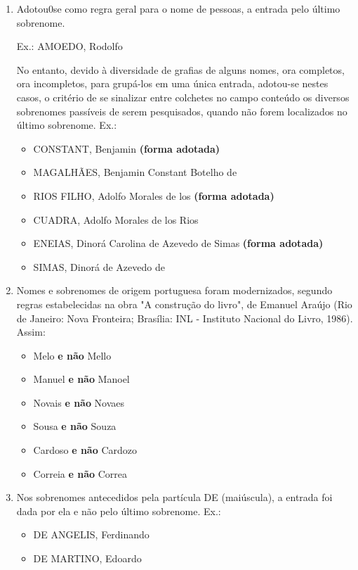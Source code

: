 \begin{enumerate}[label=(\alph*)]
	\item Adotou0se como regra geral para o nome de pessoas, a entrada pelo último sobrenome.
	
	Ex.: AMOEDO, Rodolfo
	
	No entanto, devido à diversidade de grafias de alguns nomes, ora completos, ora incompletos, para grupá-los em uma única entrada, adotou-se nestes casos, o critério de se sinalizar entre colchetes no campo conteúdo os diversos sobrenomes passíveis de serem pesquisados, quando não forem localizados no último sobrenome. Ex.:
	\begin{itemize}
		\item CONSTANT, Benjamin \textbf{(forma adotada)}
		\item MAGALHÃES, Benjamin Constant Botelho de
		\item RIOS FILHO, Adolfo Morales de los \textbf{(forma adotada)}
		\item CUADRA, Adolfo Morales de los Rios
		\item ENEIAS, Dinorá Carolina de Azevedo de Simas \textbf{(forma adotada)}
		\item SIMAS, Dinorá de Azevedo de
	\end{itemize}
	
	\item Nomes e sobrenomes de origem portuguesa foram modernizados, segundo regras estabelecidas na obra "A construção do livro", de Emanuel Araújo (Rio de Janeiro: Nova Fronteira; Brasília: INL - Instituto Nacional do Livro, 1986). Assim:
	\begin{itemize}
		\item Melo \textbf{e não} Mello
		\item Manuel \textbf{e não} Manoel
		\item Novais \textbf{e não} Novaes
		\item Sousa \textbf{e não} Souza
		\item Cardoso \textbf{e não} Cardozo
		\item Correia \textbf{e não} Correa
	\end{itemize}
	
	\item Nos sobrenomes antecedidos pela partícula DE (maiúscula), a entrada foi dada por ela e não pelo último sobrenome. Ex.:
	\begin{itemize}
		\item DE ANGELIS, Ferdinando
		\item DE MARTINO, Edoardo
	\end{itemize}


\end{enumerate}
